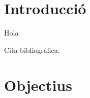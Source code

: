 \documentclass[a4paper,12pt]{book}
\renewcommand{\headrulewidth}{0pt}
\begin{document}


\frontmatter

\cleardoublepage

% 

\cleardoublepage
\setcounter{tocdepth}{2}
\renewcommand\contentsname{Índex de continguts}
\tableofcontents
\label{i:tableofcontents}

\mainmatter
\pagestyle{fancy}
\fancyhf{}
\fancyhead[LE,RO]{\leftmark}
\fancyfoot[LE,RO]{\thepage}
\renewcommand{\headrulewidth}{2pt}
\renewcommand{\footrulewidth}{1pt}

% 
\chapter{Introducció}

Hola


Cita bibliogràfica: \cite{TP}

% 
\chapter{Objectius}

%
% 
%
% 
%
% 
%
% 
%
% 
%





\appendix
% 
%
% 
%
% 




\renewcommand\bibname{Bibliografia}


\label{b:bibliography}

\end{document}

